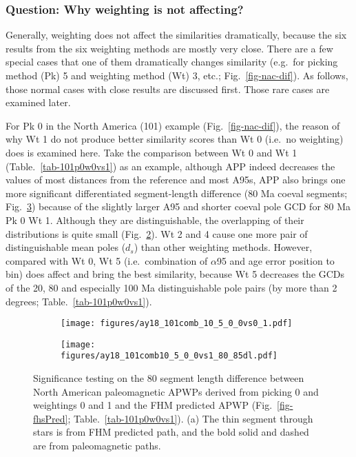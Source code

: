 \subsubsection{Question: Why weighting is not affecting?}

Generally, weighting does not affect the similarities dramatically, because the
six results from the six weighting methods are mostly very close. There are a
few special cases that one of them dramatically changes similarity (e.g.\ for
picking method (Pk) 5 and weighting method (Wt) 3, etc.;
Fig.~\ref{fig-nac-dif}). As follows, those normal cases with close results are
discussed first. Those rare cases are examined later.

For Pk 0 in the North America (101) example (Fig.~\ref{fig-nac-dif}), the reason
of why Wt 1 do not produce better similarity scores than Wt 0 (i.e.\
no weighting) does is examined here. Take the comparison between Wt 0 and Wt 1
(Table.~\ref{tab-101p0w0vs1}) as an example, although APP indeed decreases the
values of most distances from the reference and most A95s, APP also brings one
more significant differentiated segment-length difference (80\textendash85 Ma
coeval segments; Fig.~\ref{fig-101_8085}) because of the slightly larger A95 and
shorter coeval pole GCD for 80 Ma Pk 0 Wt 1. Although they are distinguishable,
the overlapping of their distributions is quite small
(Fig.~\ref{fig-nac105_00vs01dl}). Wt 2 and 4 cause one more pair of
distinguishable mean poles ($d_s$) than other weighting methods. However,
compared with Wt 0, Wt 5 (i.e.\ combination of $\alpha$95 and age error position
to bin) does affect and bring the best similarity, because Wt 5 decreases the
GCDs of the 20, 80 and especially 100 Ma distinguishable pole pairs (by more
than 2 degrees; Table.~\ref{tab-101p0w0vs1}).

\begin{figure}
\captionsetup[subfigure]{singlelinecheck=off,justification=raggedright,aboveskip=-6pt,belowskip=-6pt}
	\centering
	\begin{subfigure}{.49\textwidth}
		\caption{}\label{fig-nac105_00vs01}
		\texttt{[image: figures/ay18\_101comb\_10\_5\_0\_0vs0\_1.pdf]}
	\end{subfigure}
	\vspace{1em}
	\begin{subfigure}{.49\textwidth}
		\caption{}\label{fig-nac105_00vs01dl}
		\texttt{[image: figures/ay18\_101comb10\_5\_0\_0vs1\_80\_85dl.pdf]}
	\end{subfigure}
	\caption[101 10 5 0 0 vs 0 1 80 Ma dl]{Significance testing on
the 80\textendash85 segment length difference between North American
paleomagnetic APWPs derived from picking 0 and weightings 0 and 1 and the FHM
predicted APWP (Fig.~\ref{fig-fhsPred}; Table.~\ref{tab-101p0w0vs1}). (a) The
thin segment through stars is from FHM predicted path, and the bold solid and
dashed are from paleomagnetic paths.}\label{fig-101_8085}
\end{figure}


